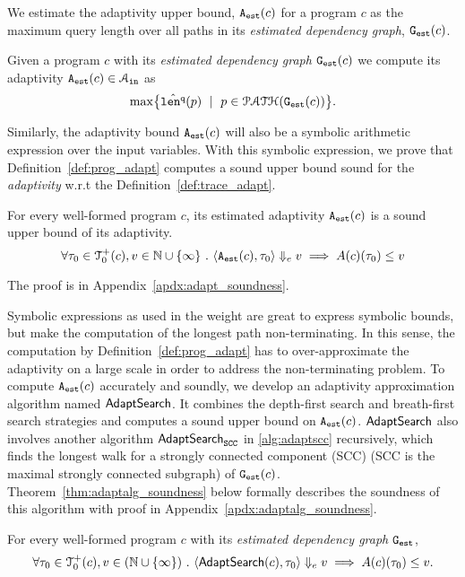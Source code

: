  We estimate the adaptivity upper bound, ${\mathtt{A_{est}}}(c)$ for a program $c$ as the maximum query length over all paths in its \emph{estimated dependency graph}, $\mathtt{{G_{est}}}({c})$. 
\begin{defn}
\label{def:prog_adapt}
{
Given a program ${c}$ with its \emph{estimated dependency graph} 
$\mathtt{{G_{est}}}({c})$ we compute its adaptivity ${\mathtt{A_{est}}}({c}) \in \mathcal{A}_{\mathtt{in}}$ as
%
\[
 \max \left\{ \hat{\qlen}(p) \ \mid \  p \in \paths(\progG(c))\right \}.
\]
}
\end{defn}
Similarly, the adaptivity bound ${\mathtt{A_{est}}}(c)$ will also be a symbolic arithmetic expression over the input variables. 
With this symbolic expression, we prove that Definition~\ref{def:prog_adapt} computes
a sound upper bound sound for the \emph{adaptivity} w.r.t the Definition~\ref{def:trace_adapt}.
\begin{thm}
 \label{thm:adaptfun_sound}
 For every well-formed program $c$, 
 its estimated adaptivity ${\mathtt{A_{est}}}({c})$ is a sound upper bound of its adaptivity.
 \[
 \forall \mathtt{\tau}_0 \in \mathcal{T}^{+}_{0}(c), v \in \mathbb{N} \cup \{\infty\} ~.~
 \langle {\ensuremath{\mathtt{A_{est}}}}(c), \mathtt{\tau}_0 \rangle \Downarrow_e v \implies A(c)(\mathtt{\tau}_0) \leq v
\] 
\end{thm}
The proof is in Appendix~\ref{apdx:adapt_soundness}.


Symbolic expressions as used in the weight are great to express symbolic bounds, but make the computation of 
the longest path non-terminating. 
In this sense, the computation by Definition~\ref{def:prog_adapt} has to
over-approximate the adaptivity on a large scale in order to address the non-terminating problem.
To compute ${\mathtt{A_{est}}}(c)$ accurately and soundly, we develop an adaptivity approximation algorithm named $\mathsf{AdaptSearch}$.
It combines the depth-first search and breath-first search strategies and computes a sound upper bound on ${\mathtt{A_{est}}}(c)$.
$\mathsf{AdaptSearch}$ also involves another algorithm $\mathsf{AdaptSearch}_{\mathtt{SCC}}$ in \ref{alg:adaptscc} recursively, which finds the longest walk for a strongly connected component (SCC) (SCC is the maximal strongly connected subgraph) of $\mathtt{{G_{est}}}(c)$.
Theorem~\ref{thm:adaptalg_soundness} below formally describes the soundness of this algorithm with proof in Appendix~\ref{apdx:adaptalg_soundness}.
\begin{thm}
 \label{thm:adaptalg_soundness}
 For every well-formed program $c$ with its \emph{estimated dependency graph} $\mathtt{{G_{est}}}$,
 \[ 
 \forall \mathtt{\tau}_0 \in \mathcal{T}^{+}_{0}(c), v \in (\mathbb{N}\cup \{\infty\}) ~.~
 \langle \mathsf{AdaptSearch}(c), \mathtt{\tau}_0 \rangle \Downarrow_e v \implies A(c)(\mathtt{\tau}_0) \leq v.
 \]
\end{thm}

